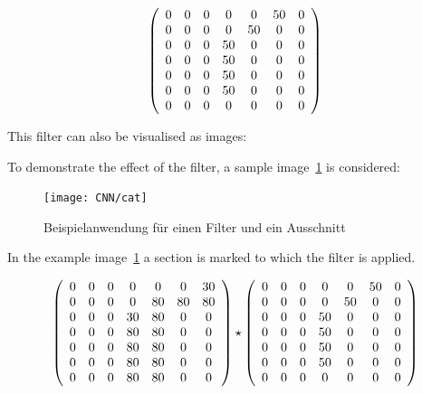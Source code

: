 {$$\left(
\begin{array}{ccc ccc c}
    0 & 0 & 0 &  0 & 0  & 50 & 0 \\
    0 & 0 & 0 &  0 & 50 &  0 & 0 \\
    0 & 0 & 0 & 50 &  0 &  0 & 0 \\
    0 & 0 & 0 & 50 &  0 &  0 & 0 \\
    0 & 0 & 0 & 50 &  0 &  0 & 0 \\
    0 & 0 & 0 & 50 &  0 &  0 & 0 \\
    0 & 0 & 0 &  0 &  0 &  0 & 0 \\
\end{array}
\right)
$$  

This filter can also be visualised as images:




To demonstrate the effect of the filter, a sample image~\ref{concept:FilterCat} is considered:


\begin{figure}
  \centering    

  \texttt{[image: CNN/cat]}
    
  \caption{Beispielanwendung für einen Filter und ein Ausschnitt}\label{concept:FilterCat}
\end{figure}

In the example image~\ref{concept:FilterCat} a section is marked to which the filter is applied. 



$$
\left(
\begin{array}{ccc ccc c}
    0 & 0 & 0 &  0 & 0  &  0 & 30 \\
    0 & 0 & 0 &  0 & 80 & 80 & 80 \\
    0 & 0 & 0 & 30 & 80 &  0 &  0 \\
    0 & 0 & 0 & 80 & 80 &  0 &  0 \\
    0 & 0 & 0 & 80 & 80 &  0 &  0 \\
    0 & 0 & 0 & 80 & 80 &  0 &  0 \\
    0 & 0 & 0 & 80 & 80 &  0 &  0 \\
\end{array}
\right)
\star
\left(
\begin{array}{ccc ccc c}
    0 & 0 & 0 &  0 & 0  & 50 & 0 \\
    0 & 0 & 0 &  0 & 50 &  0 & 0 \\
    0 & 0 & 0 & 50 &  0 &  0 & 0 \\
    0 & 0 & 0 & 50 &  0 &  0 & 0 \\
    0 & 0 & 0 & 50 &  0 &  0 & 0 \\
    0 & 0 & 0 & 50 &  0 &  0 & 0 \\
    0 & 0 & 0 &  0 &  0 &  0 & 0 \\
\end{array}
\right)$$

}
